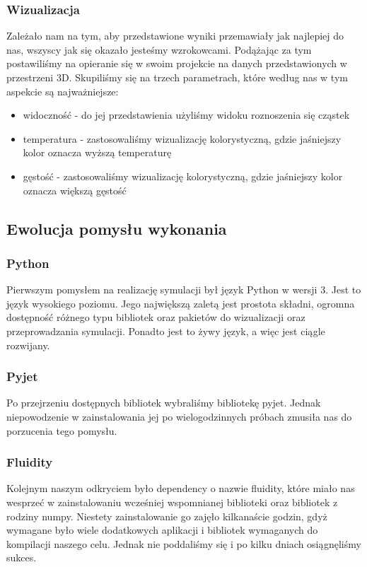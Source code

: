 \documentclass{article}
\begin{document}
            \subsubsection{Wizualizacja}
            Zależało nam na tym, aby przedstawione wyniki przemawiały jak najlepiej do nas, wszyscy jak się okazało jesteśmy wzrokowcami. Podążając za tym postawiliśmy na opieranie się w swoim projekcie na danych przedstawionych w przestrzeni 3D. Skupiliśmy się na trzech parametrach, które według nas w tym aspekcie są najważniejsze:
            \begin{itemize}
                \item widoczność - do jej przedstawienia użyliśmy widoku roznoszenia się cząstek
                \item temperatura - zastosowaliśmy wizualizację kolorystyczną, gdzie jaśniejszy kolor oznacza wyższą temperaturę
                \item gęstość - zastosowaliśmy wizualizację kolorystyczną, gdzie jaśniejszy kolor oznacza większą gęstość
            \end{itemize}
            
        \subsection{Ewolucja pomysłu wykonania}
        
        \medskip
        \medskip
            \subsubsection*{Python}
            Pierwszym pomysłem na realizację symulacji był język Python w wersji 3. Jest to język wysokiego poziomu. Jego największą zaletą jest prostota składni, ogromna dostępność różnego typu bibliotek oraz pakietów do wizualizacji oraz przeprowadzania symulacji. Ponadto jest to żywy język, a więc jest ciągle rozwijany. 
            
            \medskip
            \subsubsection*{Pyjet}
            \noindent Po przejrzeniu dostępnych bibliotek wybraliśmy bibliotekę pyjet. Jednak niepowodzenie w zainstalowania jej po wielogodzinnych próbach zmusiła nas do porzucenia tego pomysłu.
            
            \medskip
            \subsubsection*{Fluidity}
            \noindent Kolejnym naszym odkryciem było dependency o nazwie fluidity, które miało nas wesprzeć w zainstalowaniu wcześniej wspomnianej biblioteki oraz bibliotek z rodziny numpy. Niestety zainstalowanie go zajęło kilkanaście godzin, gdyż wymagane było wiele dodatkowych aplikacji i bibliotek wymaganych do kompilacji naszego celu. Jednak nie poddaliśmy się i po kilku dniach osiągnęliśmy sukces. 
            
\end{document}
